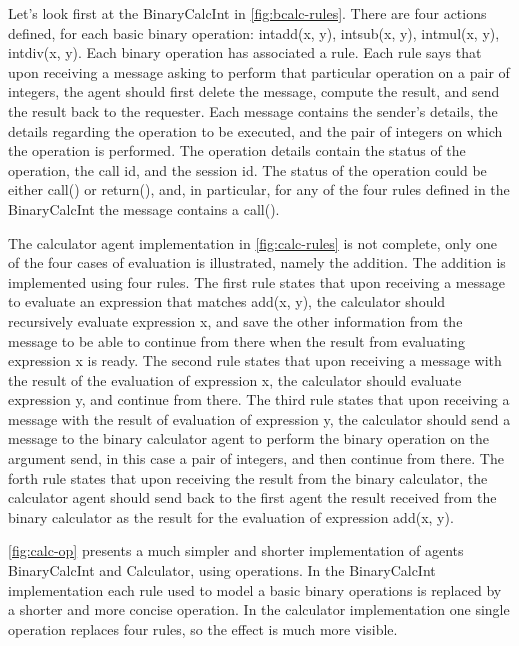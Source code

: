 \documentclass[a4paper,12pt,oneside,fleqn]{book} %
\begin{document}
Let's look first at the BinaryCalcInt in \autoref{fig:bcalc-rules}. There are four
actions defined, for each basic binary operation: intadd(x, y), intsub(x,
y), intmul(x, y), intdiv(x, y). Each binary operation has associated
a rule. Each rule says that upon receiving a message asking to perform that
particular operation on a pair of integers, the agent should first delete
the message, compute the result, and send the result back to the requester.
Each message contains the sender's details, the details regarding the
operation to be executed, and the pair of integers on which the operation
is performed. The operation details contain the status of the operation,
the call id, and the session id. The status of the operation could be
either call() or return(), and, in particular, for any of the four rules
defined in the BinaryCalcInt the message contains a call().

The calculator agent implementation in \autoref{fig:calc-rules} is not
complete, only one of the four cases of evaluation is illustrated, namely
the addition. The addition is implemented using four rules. The first rule
states that upon receiving a message to evaluate an expression that matches
add(x, y), the calculator should recursively evaluate expression x, and save
the other information from the message to be able to continue from there when
the result from evaluating expression x is ready. The second rule states
that upon receiving a message with the result of the evaluation of
expression x, the calculator should evaluate expression y, and continue
from there. The third rule states that upon receiving a message with the
result of evaluation of expression y, the calculator should send a message
to the binary calculator agent to perform the binary operation on the
argument send, in this case a pair of integers, and then continue from
there. The forth rule states that upon receiving the result from the
binary calculator, the calculator agent should send back to the first agent
the result received from the binary calculator as the result for the
evaluation of expression add(x, y).

\autoref{fig:calc-op} presents a much simpler and shorter implementation of
agents BinaryCalcInt and Calculator, using operations. In the BinaryCalcInt
implementation each rule used to model a basic binary operations is
replaced by a shorter and more concise operation. In the calculator
implementation one single operation replaces four rules, so the effect is
much more visible.
\end{document}
